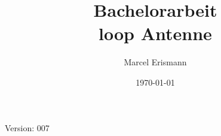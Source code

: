 \documentclass[10pt,a4paper]{article}
\author{Marcel Erismann}
\date{\today}
\title{Bachelorarbeit \\ \footnotesize{loop Antenne}}
\begin{document}
	
	Version: 007
	\tableofcontents 
	\newpage
	
\end{document}
